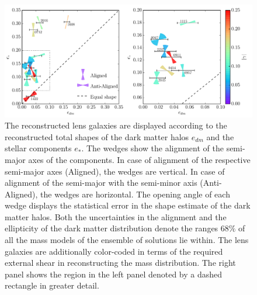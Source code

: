 \documentclass[useAMS,usenatbib]{mn2e}
\begin{document}
\begin{figure}
  \centering
  \includegraphics[width=\linewidth]{Figures/wedges_shears.pdf}
  \caption[width=\linewidth]{The reconstructed lens galaxies are displayed according to the reconstructed total shapes of the dark matter halos $e_{dm}$ and the stellar components $e_{*}$. The wedges show the alignment of the semi-major axes of the components. In case of alignment of the respective semi-major axes (Aligned), the wedges are vertical. In case of alignment of the semi-major with the semi-minor axis (Anti-Aligned), the wedges are horizontal. The opening angle of each wedge displays the statistical error in the shape estimate of the dark matter halos. Both the uncertainties in the alignment and the ellipticity of the dark matter distribution denote the ranges $68\%$ of all the mass models of the ensemble of solutions lie within. The lens galaxies are additionally color-coded in terms of the required external shear in reconstructing the mass distribution. The right panel shows the region in the left panel denoted by a dashed rectangle in greater detail.}
  \label{fig:wedgesall}
\end{figure}
\end{document}
